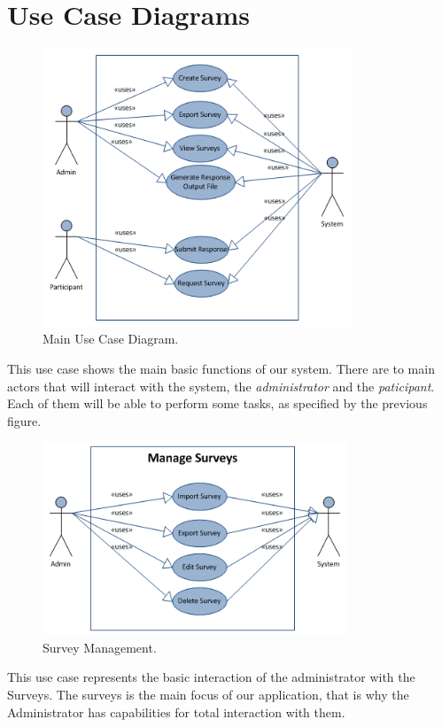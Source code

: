 \documentclass[a4paper,12pt,oneside]{report}
\begin{document}
\section{Use Case Diagrams}
\vskip 2cm
\begin{figure}[h!]
  \begin{center}
   \includegraphics[width=9.2cm]{pics/usecase.png}
  \end{center}
\caption{Main Use Case Diagram.}
\end{figure}
\vskip 2cm
This use case shows the main basic functions of our system. There are to main actors that will interact with the system, the \emph{administrator} and the \emph{paticipant}. Each of them will be able to perform some tasks, as specified by the previous figure.

\newpage
\begin{figure}[h!]
  \begin{center}
\vskip 2cm
   \includegraphics[width=9.1cm]{pics/manageSurveys.png}
  \end{center}
\caption{Survey Management.}
\end{figure}
\vskip 2cm
This use case represents the basic interaction of the administrator with the Surveys. The surveys is the main focus of our application, that is why the Administrator has capabilities for total interaction with them.
\end{document}

